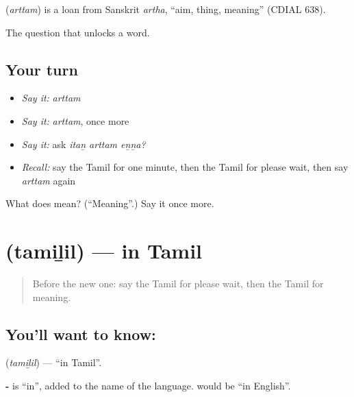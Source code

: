 \begin{cousinweb}
\textbf{} (\emph{arttam}) is a loan from Sanskrit \emph{artha}, \textquotedblleft{}aim, thing, meaning\textquotedblright{} (CDIAL 638).
\end{cousinweb}

\begin{grammarlens}[title={What you've built}]
The question that unlocks a word.
\end{grammarlens}

\subsection*{Your turn}
\begin{itemize}
\raggedright
  \item \emph{Say it:} \emph{arttam}
  \item \emph{Say it:} \emph{arttam}, once more
  \item \emph{Say it:} ask \emph{itaṉ arttam eṉṉa?}
  \item \emph{Recall:} say the Tamil for one minute, then the Tamil for please wait, then say \emph{arttam} again
\end{itemize}

\begin{tcolorbox}[breakable,colback=teal!4,colframe=teal!35!black,title={Before you move on}]
What does  mean? (\textquotedblleft{}Meaning\textquotedblright{}.) Say it once more.
\end{tcolorbox}
\section[\texorpdfstring{\ta{தமிழில்} (tamiḻil)}{தமிழில் (tamiḻil)}]{ (tamiḻil) — in Tamil}

\label{lesson:TA-C93-intamil}



\begin{quote}
Before the new one: say the Tamil for please wait, then the Tamil for meaning.
\end{quote}

\subsection*{You'll want to know: }
\textbf{} (\emph{tamiḻil}) — \textquotedblleft{}in Tamil\textquotedblright{}.

\textbf{-} is \textquotedblleft{}in\textquotedblright{}, added to the name of the language. \textbf{} would be \textquotedblleft{}in English\textquotedblright{}.

